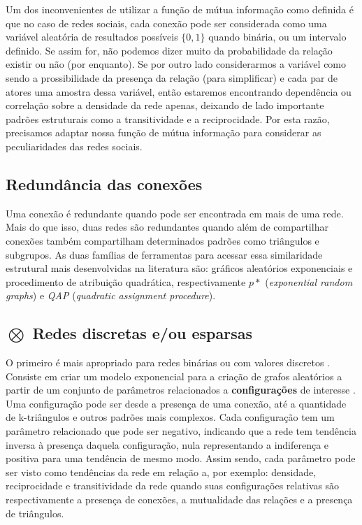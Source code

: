 Um dos inconvenientes de utilizar a função de mútua informação como definida é
que no caso de redes sociais, cada conexão pode ser considerada como uma
variável aleatória de resultados possíveis $\{0,1\}$ quando binária, ou um
intervalo definido. Se assim for, não podemos dizer muito da probabilidade da
relação existir ou não (por enquanto). Se por outro lado considerarmos a
variável como sendo a prossibilidade da presença da relação (para simplificar) e
cada par de atores uma amostra dessa variável, então estaremos encontrando
dependência ou correlação sobre a densidade da rede apenas, deixando de lado
importante padrões estruturais como a transitividade e a reciprocidade. Por esta
razão, precisamos adaptar nossa função de mútua informação para considerar as
peculiaridades das redes sociais. 

\subsection{Redundância das conexões}

Uma conexão é redundante quando pode ser encontrada em mais de uma rede. Mais do
que isso, duas redes são redundantes quando além de compartilhar conexões também
compartilham determinados padrões como triângulos e subgrupos. As duas
famílias de ferramentas para acessar essa similaridade estrutural mais
desenvolvidas na literatura são: gráficos aleatórios exponenciais e procedimento
de atribuição quadrática, respectivamente $p*$ (\emph{exponential random
graphs}) e \emph{QAP} (\emph{quadratic assignment procedure}).

\subsection{$\bigotimes$ Redes discretas e/ou esparsas}

O primeiro é mais apropriado para redes binárias ou com valores discretos
\citep{Dekker2007}. Consiste em criar um modelo exponencial para a criação de
grafos aleatórios a partir de um conjunto de parâmetros relacionados a
\textbf{configurações} de interesse \citep{ROBINS2007a}. Uma configuração pode
ser desde a presença de uma conexão, até a quantidade de k-triângulos e outros
padrões mais complexos. Cada configuração tem um parâmetro relacionado que pode
ser negativo, indicando que a rede tem tendência inversa à presença daquela
configuração, nula representando a indiferença e positiva para uma tendência de
mesmo modo. Assim sendo, cada parâmetro pode ser visto como tendências da rede em
relação a, por exemplo: densidade, reciprocidade e transitividade da rede quando
suas configurações relativas são respectivamente a presença de conexões, a
mutualidade das relações e a presença de triângulos.

